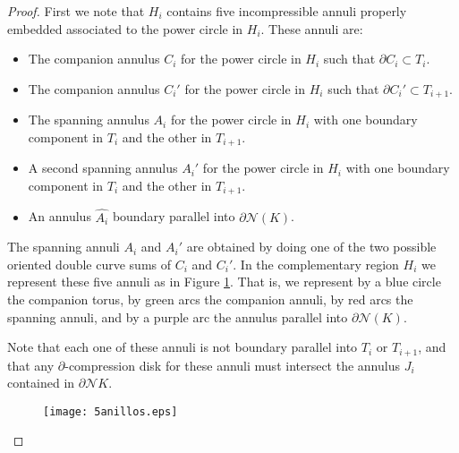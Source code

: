 \documentclass[12pt]{amsart}
\begin{document}
\begin{proof}

First we note that $H_i$ contains five incompressible annuli properly embedded associated to the power circle in $H_i$. These annuli are: 
\begin{itemize}
    \item The companion annulus $C_i$ for the power circle in $H_i$ such that $\partial C_i\subset T_i$.
    \item The companion annulus $C_i'$ for the power circle in $H_i$ such that $\partial C_i'\subset T_{i+1}$.
    \item The spanning annulus $A_i$ for the power circle in $H_i$ with one boundary component in $T_i$ and the other in $T_{i+1}$.
    \item A second spanning annulus $A_i'$ for the power circle in $H_i$  with one boundary component in $T_i$ and the other in $T_{i+1}$.
    \item An annulus $\widehat{A_i}$ boundary parallel into $\partial\mathcal{N}(K)$.
\end{itemize}

The spanning annuli $A_i$ and $A_i'$ are obtained by doing one of the two possible oriented double curve sums of $C_i$ and $C_i'$.
In the complementary region $H_i$ we represent these five annuli as in Figure \ref{anillos}. That is, we represent by a blue circle the companion torus, by green arcs the companion annuli, by red arcs the spanning annuli, and by a purple arc the annulus parallel into $\partial\mathcal{N}(K)$.

Note that each one of these annuli is not boundary parallel into $T_i$ or $T_{i+1}$, and that any $\partial$-compression disk for these annuli must intersect the annulus $J_i$ contained in $\partial \mathcal{N}K$.

\begin{figure}
\begin{center}
\texttt{[image: 5anillos.eps]}    
\end{center}
\caption{}
\label{anillos}
\end{figure}


\end{proof}
\end{document}
